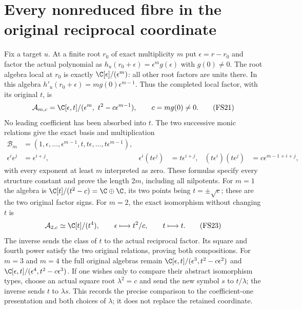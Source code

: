 \section{Every nonreduced fibre in the original reciprocal coordinate}
Fix a target $u$. At a finite root $r_0$ of exact multiplicity
$m$ put $\epsilon=r-r_0$ and factor the actual polynomial as
$h_u(r_0+\epsilon)=\epsilon^m g(\epsilon)$ with $g(0)\ne0$.
The root algebra local at $r_0$ is exactly
$\C[\epsilon]/(\epsilon^m)$: all other root factors are
units there. In this algebra
$h'_u(r_0+\epsilon)=m g(0)\epsilon^{m-1}$.
Thus the completed local factor, with its original $t$,
is
\begin{equation}
\mathcal A_{m,c}
=\C[\epsilon,t]/(\epsilon^m,\ t^2-c\epsilon^{m-1}),
\qquad c=m g(0)\ne0 .
\tag{FS21}
\end{equation}
No leading coefficient has been absorbed into $t$.
The two successive monic relations give the exact basis
and multiplication
\begin{align}
\mathcal B_m&=(1,\epsilon,\ldots,\epsilon^{m-1},
              t,t\epsilon,\ldots,t\epsilon^{m-1}),\nonumber\\
\epsilon^i\epsilon^j&=\epsilon^{i+j},&
\epsilon^i(t\epsilon^j)&=t\epsilon^{i+j},&
(t\epsilon^i)(t\epsilon^j)&=c\epsilon^{m-1+i+j},
\tag{FS22}
\end{align}
with every exponent at least $m$ interpreted as zero.
These formulas specify every structure constant and prove
the length $2m$, including all nilpotents.
For $m=1$ the algebra is
$\C[t]/(t^2-c)=\C\oplus\C$, its two points being
$t=\pm\sqrt c$; these are the two original factor signs.
For $m=2$, the exact isomorphism without changing $t$ is
\begin{equation}
\mathcal A_{2,c}\simeq\C[t]/(t^4),\qquad
\epsilon\longmapsto t^2/c,\qquad
t\longmapsto t .
\tag{FS23}
\end{equation}
The inverse sends the class of $t$ to the actual reciprocal
factor. Its square and fourth power satisfy the two original
relations, proving both compositions.
For $m=3$ and $m=4$ the full original algebras remain
$\C[\epsilon,t]/(\epsilon^3,t^2-c\epsilon^2)$ and
$\C[\epsilon,t]/(\epsilon^4,t^2-c\epsilon^3)$.
If one wishes only to compare their abstract isomorphism
types, choose an actual square root $\lambda^2=c$ and send
the new symbol $s$ to $t/\lambda$; the inverse sends $t$
to $\lambda s$. This records the precise comparison to
the coefficient-one presentation and both choices of
$\lambda$; it does not replace the retained coordinate.

